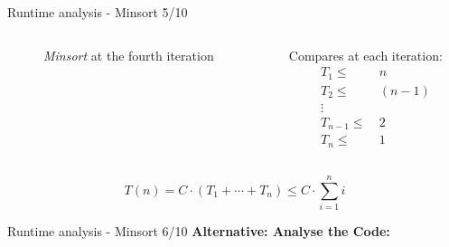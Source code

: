 \begin{frame}{Runtime analysis - Minsort 5/10}
  \begin{columns}
    \begin{column}{0.55\textwidth}
      \begin{figure}[!h]%
        \begin{minipage}[!h]{\linewidth}%
        \end{minipage}%
        \caption{\textit{Minsort} at the fourth iteration}%
        \label{fig:minsort_brace}%
      \end{figure}
    \end{column}
    \begin{column}{0.40\textwidth}
      Compares at each iteration:
      \begin{align*}
        T_1  \leq &~ n\\
        T_2  \leq &~ (n-1)\\
        {}  \vdots~ &~ {} \\
        T_{n-1}  \leq &~ 2\\
        T_n  \leq &~ 1
      \end{align*}
    \end{column}
  \end{columns}
  \[
    T(n)
      = C \cdot \left(T_1 + \cdots + T_n\right)
      \leq C \cdot \sum \limits^n_{i=1} i
  \]
\end{frame}


\begin{frame}{Runtime analysis - Minsort 6/10}
  \textbf{Alternative: Analyse the Code:}
  
\end{frame}


